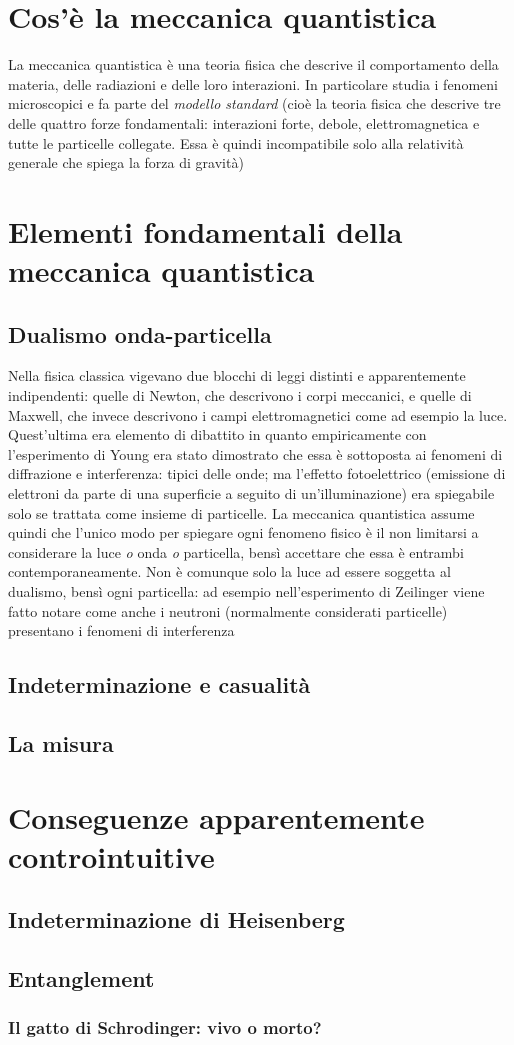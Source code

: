 \section{Cos'è la meccanica quantistica}
La meccanica quantistica è una teoria fisica che descrive il comportamento della materia, delle radiazioni e delle loro interazioni. In particolare studia i fenomeni microscopici e fa parte del \textit{modello standard} (cioè la teoria fisica che descrive tre delle quattro forze fondamentali: interazioni forte, debole, elettromagnetica e tutte le particelle collegate. Essa è quindi incompatibile solo alla relatività generale che spiega la forza di gravità)

\section{Elementi fondamentali della meccanica quantistica}
\subsection{Dualismo onda-particella}
Nella fisica classica vigevano due blocchi di leggi distinti e apparentemente indipendenti: quelle di Newton, che descrivono i corpi meccanici, e quelle di Maxwell, che invece descrivono i campi elettromagnetici come ad esempio la luce. Quest'ultima era elemento di dibattito in quanto empiricamente con l'esperimento di Young era stato dimostrato che essa è sottoposta ai fenomeni di diffrazione e interferenza: tipici delle onde; ma l'effetto fotoelettrico (emissione di elettroni da parte di una superficie a seguito di un'illuminazione) era spiegabile solo se trattata come insieme di particelle.
La meccanica quantistica assume quindi che l'unico modo per spiegare ogni fenomeno fisico è il non limitarsi a considerare la luce \textit{o} onda \textit{o} particella, bensì accettare che essa è entrambi contemporaneamente.
Non è comunque solo la luce ad essere soggetta al dualismo, bensì ogni particella: ad esempio nell'esperimento di Zeilinger viene fatto notare come anche i neutroni (normalmente considerati particelle) presentano i fenomeni di interferenza
\subsection{Indeterminazione e casualità}
\subsection{La misura}
\section{Conseguenze apparentemente controintuitive}
\subsection{Indeterminazione di Heisenberg}
\subsection{Entanglement}
\subsubsection{Il gatto di Schrodinger: vivo o morto?}